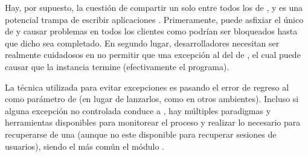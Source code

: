 Hay, por supuesto, la cuestión de compartir un solo \threadPL entre todos los \requestINT de \clientsAS, y es una potencial trampa de escribir aplicaciones \nodejsNAME. Primeramente, \heavyComputationPC puede asfixiar el único \threadPL de \nodejsNAME y causar problemas en todos los clientes como \incommingRequestINT podrían ser bloqueados hasta que dicho \computationPC sea completado. En segundo lugar, desarrolladores necesitan ser realmente cuidadosos en no permitir que una excepción \bubblingUpPL al \coreAS del \eventloopCPT de \nodejsNAME, el cual puede causar que la instancia \nodejsNAME termine (efectivamente \crashingPC el programa).

La técnica utilizada para evitar excepciones \bubblingUpSurfacePL es pasando el error de regreso al \callerAS como parámetro de \callbackPL (en lugar de lanzarlos, como en otros ambientes). Incluso si alguna excepción no controlada conduce a \bubblingUpPL, hay múltiples paradigmas y herramientas disponibles para monitorear el proceso \nodejsNAME y realizar lo necesario para recuperarse de una \crashedInstancePL (aunque no este disponible para recuperar sesiones de usuarios), siendo el más común el módulo \moduleForeverNAME \cite{online_github_nodejitsu_forever}.



